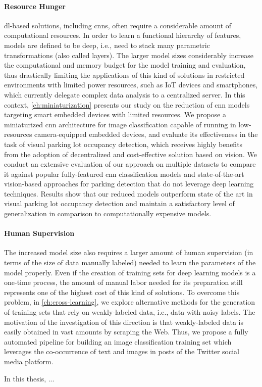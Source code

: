 \paragraph{Resource Hunger}
\Gls{dl}-based solutions, including \glspl{cnn}, often require a considerable amount of computational resources.
In order to learn a functional hierarchy of features, models are defined to be deep, i.e., need to stack many parametric transformations (also called layers).
The larger model sizes considerably increase the computational and memory budget for the model training and evaluation, thus
drastically limiting the applications of this kind of solutions in restricted environments with limited power resources, such as IoT devices and smartphones, which currently delegate complex data analysis to a centralized server.
In this context, \ref{ch:miniaturization} presents our study on the reduction of \gls{cnn} models targeting smart embedded devices with limited resources.
We propose a miniaturized \gls{cnn} architecture for image classification capable of running in low-resources camera-equipped embedded devices, and evaluate its effectiveness in the task of visual parking lot occupancy detection, which receives highly benefits from the adoption of decentralized and cost-effective solution based on vision.
We conduct an extensive evaluation of our approach on multiple datasets to compare it against popular fully-featured \gls{cnn} classification models and state-of-the-art vision-based approaches for parking detection that do not leverage deep learning techniques.
Results show that our reduced models outperform state of the art in visual parking lot occupancy detection and maintain a satisfactory level of generalization in comparison to computationally expensive models.

\paragraph{Human Supervision}
The increased model size also requires a larger amount of human supervision (in terms of the size of data manually labeled) needed to learn the parameters of the model properly.
Even if the creation of training sets for deep learning models is a one-time process, the amount of manual labor needed for its preparation still represents one of the highest cost of this kind of solutions.
To overcome this problem, in \ref{ch:cross-learning}, we explore alternative methods for the generation of training sets that rely on weakly-labeled data, i.e., data with noisy labels.
The motivation of the investigation of this direction is that weakly-labeled data is easily obtained in vast amounts by scraping the Web.
Thus, we propose a fully automated pipeline for building an image classification training set which leverages the co-occurrence of text and images in posts of the Twitter social media platform.



In this thesis, ...




